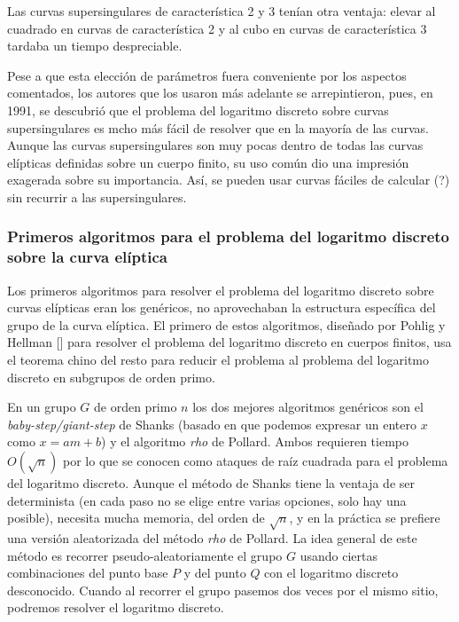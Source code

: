 \documentclass[
  a4paper,
  12pt,
  spanish,
]{scrartcl}
\begin{document}
Las curvas supersingulares de característica 2 y 3 tenían otra ventaja: elevar al cuadrado en curvas de característica 2 y al cubo en curvas de característica 3 tardaba un tiempo despreciable.

Pese a que esta elección de parámetros fuera conveniente por los aspectos comentados, los autores que los usaron más adelante se arrepintieron, pues, en 1991, se descubrió que el problema del logaritmo discreto sobre curvas supersingulares es mcho más fácil de resolver que en la mayoría de las curvas. Aunque las curvas supersingulares son muy pocas dentro de todas las curvas elípticas definidas sobre un cuerpo finito, su uso común dio una impresión exagerada sobre su importancia. Así, se pueden usar curvas fáciles de calcular (?)  sin recurrir a las supersingulares.

\subsubsection{Primeros algoritmos para el problema del logaritmo discreto sobre la curva elíptica} %

Los primeros algoritmos para resolver el problema del logaritmo discreto sobre curvas elípticas eran los genéricos, no aprovechaban la estructura específica del grupo de la curva elíptica. El primero de estos algoritmos, diseñado por Pohlig y Hellman [] para resolver el problema del logaritmo discreto en cuerpos finitos, usa el teorema chino del resto para reducir el problema al problema del logaritmo discreto en subgrupos de orden primo.

En un grupo $G$ de orden primo $n$ los dos mejores algoritmos genéricos son el \textit{baby-step/giant-step} de Shanks (basado en que podemos expresar un entero $x$ como $x = am + b$) y el algoritmo \textit{rho} de Pollard. Ambos requieren tiempo $O(\sqrt{n})$ por lo que se conocen como ataques de raíz cuadrada para el problema del logaritmo discreto. Aunque el método de Shanks tiene la ventaja de ser determinista (en cada paso no se elige entre varias opciones, solo hay una posible), necesita mucha memoria, del orden de $\sqrt{n}$, y en la práctica se prefiere una versión aleatorizada del método \textit{rho} de Pollard. La idea general de este método es recorrer pseudo-aleatoriamente el grupo $G$ usando ciertas combinaciones del punto base $P$ y del punto $Q$ con el logaritmo discreto desconocido. Cuando al recorrer el grupo pasemos dos veces por el mismo sitio, podremos resolver el logaritmo discreto.
\end{document}
